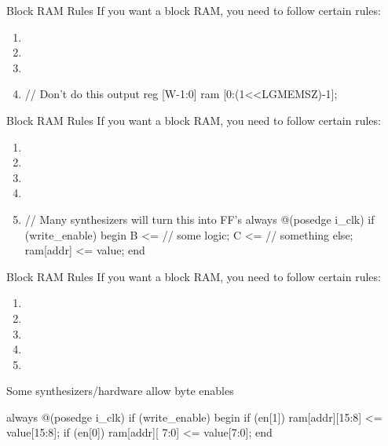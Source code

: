 \documentclass[style=gt,mode=present,paper=screen]{powerdot}
\begin{document}
\begin{slide}[bm=,toc=,method=direct]{Block RAM Rules}
If you want a block RAM, you need to follow certain rules:
\begin{enumerate}
\item {}
\item {}
\item {}
\item {}
\begin{zformal}
// Don't do this
output reg [W-1:0] ram [0:(1<<LGMEMSZ)-1];
\end{zformal}
\end{enumerate}
\end{slide}
%
%
\begin{slide}[bm=,toc=,method=direct]{Block RAM Rules}
If you want a block RAM, you need to follow certain rules:
\begin{enumerate}
\item {}
\item {}
\item {}
\item {}
\item {}
\begin{zformal}
// Many synthesizers will turn this into FF's
always @(posedge i_clk)
if (write_enable)
begin
	B <= // some logic;
	C <= // something else;
	ram[addr] <= value;
end
\end{zformal}
\end{enumerate}
\end{slide}
%
%
\begin{slide}[bm=,toc=,method=direct]{Block RAM Rules}
If you want a block RAM, you need to follow certain rules:
\begin{enumerate}
\item {}
\item {}
\item {}
\item {}
\item {}
\end{enumerate}
Some synthesizers/hardware allow byte enables
\begin{zformal}
always @(posedge i_clk)
if (write_enable)
begin
	if (en[1])
		ram[addr][15:8] <= value[15:8];
	if (en[0])
		ram[addr][ 7:0] <= value[7:0];
end
\end{zformal}
\end{slide}
%
%
\end{document}
